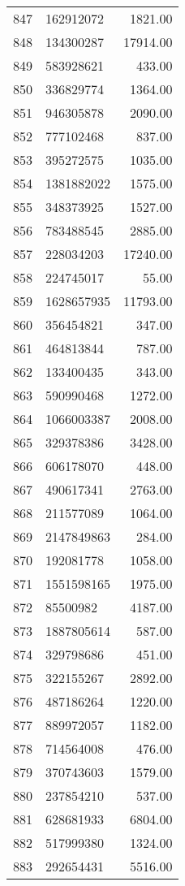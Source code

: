 \begin{table}[ht]
\begin{tabular}{rlr}
  847 & 162912072 & 1821.00 \\ 
  848 & 134300287 & 17914.00 \\ 
  849 & 583928621 & 433.00 \\ 
  850 & 336829774 & 1364.00 \\ 
  851 & 946305878 & 2090.00 \\ 
  852 & 777102468 & 837.00 \\ 
  853 & 395272575 & 1035.00 \\ 
  854 & 1381882022 & 1575.00 \\ 
  855 & 348373925 & 1527.00 \\ 
  856 & 783488545 & 2885.00 \\ 
  857 & 228034203 & 17240.00 \\ 
  858 & 224745017 & 55.00 \\ 
  859 & 1628657935 & 11793.00 \\ 
  860 & 356454821 & 347.00 \\ 
  861 & 464813844 & 787.00 \\ 
  862 & 133400435 & 343.00 \\ 
  863 & 590990468 & 1272.00 \\ 
  864 & 1066003387 & 2008.00 \\ 
  865 & 329378386 & 3428.00 \\ 
  866 & 606178070 & 448.00 \\ 
  867 & 490617341 & 2763.00 \\ 
  868 & 211577089 & 1064.00 \\ 
  869 & 2147849863 & 284.00 \\ 
  870 & 192081778 & 1058.00 \\ 
  871 & 1551598165 & 1975.00 \\ 
  872 & 85500982 & 4187.00 \\ 
  873 & 1887805614 & 587.00 \\ 
  874 & 329798686 & 451.00 \\ 
  875 & 322155267 & 2892.00 \\ 
  876 & 487186264 & 1220.00 \\ 
  877 & 889972057 & 1182.00 \\ 
  878 & 714564008 & 476.00 \\ 
  879 & 370743603 & 1579.00 \\ 
  880 & 237854210 & 537.00 \\ 
  881 & 628681933 & 6804.00 \\ 
  882 & 517999380 & 1324.00 \\ 
  883 & 292654431 & 5516.00 \\ 

\end{tabular}
\end{table}
